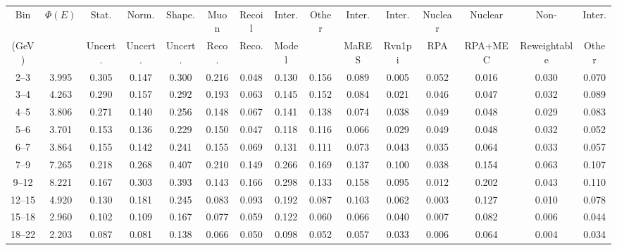 \begin{turnpage}
\begin{table}[hpt]
   \setlength{\tabcolsep}{4pt}
    \begin{tabular}{ccccc|cccc|cccccc}
    \hline
 Bin & $\Phi(E)$ & 	 Stat.  & 	 Norm. & 	 Shape. & 	 Muon  & 	 Recoil  & 	 Inter.  & 	 Other & Inter. &  	 Inter. &  	 Nuclear &  	 Nuclear &  	 Non- &  	 Inter. \\
 (GeV) 	    &                  & 	Uncert.  & 	 Uncert. & 	 Uncert. 	& 	  Reco. & 	 Reco.  & 	  Model & 	 & MaRES &  Rvn1pi &  	 RPA &  	 RPA+MEC &  	 Reweightable & Other \\
    \hline
 2--3 & 	 3.995 &  	 0.305 &  	 0.147 &  	 0.300 &  	 0.216 &  	 0.048 &  	 0.130 &  	 0.156 &  	 0.089 &  	 0.005 &  	 0.052 &  	 0.016 &  	 0.030 &  	 0.070 \\ 
 3--4 & 	 4.263 &  	 0.290 &  	 0.157 &  	 0.292 &  	 0.193 &  	 0.063 &  	 0.145 &  	 0.152 &  	 0.084 &  	 0.021 &  	 0.046 &  	 0.047 &  	 0.032 &  	 0.089 \\ 
 4--5 & 	 3.806 &  	 0.271 &  	 0.140 &  	 0.256 &  	 0.148 &  	 0.067 &  	 0.141 &  	 0.138 &  	 0.074 &  	 0.038 &  	 0.049 &  	 0.048 &  	 0.029 &  	 0.083 \\ 
 5--6 & 	 3.701 &  	 0.153 &  	 0.136 &  	 0.229 &  	 0.150 &  	 0.047 &  	 0.118 &  	 0.116 &  	 0.066 &  	 0.029 &  	 0.049 &  	 0.048 &  	 0.032 &  	 0.052 \\ 
 6--7 & 	 3.864 &  	 0.155 &  	 0.142 &  	 0.241 &  	 0.155 &  	 0.069 &  	 0.131 &  	 0.111 &  	 0.073 &  	 0.043 &  	 0.035 &  	 0.064 &  	 0.033 &  	 0.057 \\ 
 7--9 & 	 7.265 &  	 0.218 &  	 0.268 &  	 0.407 &  	 0.210 &  	 0.149 &  	 0.266 &  	 0.169 &  	 0.137 &  	 0.100 &  	 0.038 &  	 0.154 &  	 0.063 &  	 0.107 \\ 
 9--12 & 	 8.221 &  	 0.167 &  	 0.303 &  	 0.393 &  	 0.143 &  	 0.166 &  	 0.298 &  	 0.133 &  	 0.158 &  	 0.095 &  	 0.012 &  	 0.202 &  	 0.043 &  	 0.110 \\ 
 12--15 & 	 4.920 &  	 0.130 &  	 0.181 &  	 0.245 &  	 0.083 &  	 0.093 &  	 0.192 &  	 0.087 &  	 0.103 &  	 0.062 &  	 0.003 &  	 0.127 &  	 0.010 &  	 0.078 \\ 
 15--18 & 	 2.960 &  	 0.102 &  	 0.109 &  	 0.167 &  	 0.077 &  	 0.059 &  	 0.122 &  	 0.060 &  	 0.066 &  	 0.040 &  	 0.007 &  	 0.082 &  	 0.006 &  	 0.044 \\ 
 18--22 & 	 2.203 &  	 0.087 &  	 0.081 &  	 0.138 &  	 0.066 &  	 0.050 &  	 0.098 &  	 0.052 &  	 0.057 &  	 0.033 &  	 0.006 &  	 0.064 &  	 0.004 &  	 0.034 \\ 

\end{tabular}
\end{table}
\end{turnpage}
